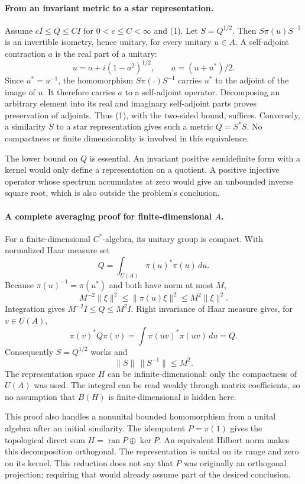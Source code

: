 \documentclass[11pt]{article}
\begin{document}
\paragraph{From an invariant metric to a star representation.}
Assume $cI\le Q\le CI$ for $0<c\le C<\infty$ and (1). Let $S=Q^{1/2}$. Then $S\pi(u)S^{-1}$ is an invertible isometry, hence unitary, for every unitary $u\in A$. A self-adjoint contraction $a$ is the real part of a unitary:
\[
 u=a+i(1-a^2)^{1/2},\qquad a=(u+u^*)/2.
\]
Since $u^*=u^{-1}$, the homomorphism $S\pi(\cdot)S^{-1}$ carries $u^*$ to the adjoint of the image of $u$. It therefore carries $a$ to a self-adjoint operator. Decomposing an arbitrary element into its real and imaginary self-adjoint parts proves preservation of adjoints. Thus (1), with the two-sided bound, suffices. Conversely, a similarity $S$ to a star representation gives such a metric $Q=S^*S$. No compactness or finite dimensionality is involved in this equivalence.

The lower bound on $Q$ is essential. An invariant positive semidefinite form with a kernel would only define a representation on a quotient. A positive injective operator whose spectrum accumulates at zero would give an unbounded inverse square root, which is also outside the problem's conclusion.

\paragraph{A complete averaging proof for finite-dimensional $A$.}
For a finite-dimensional $C^*$-algebra, its unitary group is compact. With normalized Haar measure set
\[
 Q=\int_{U(A)}\pi(u)^*\pi(u)\,du.
\]
Because $\pi(u)^{-1}=\pi(u^*)$ and both have norm at most $M$,
\[
 M^{-2}\|\xi\|^2\le\|\pi(u)\xi\|^2\le M^2\|\xi\|^2.
\]
Integration gives $M^{-2}I\le Q\le M^2I$. Right invariance of Haar measure gives, for $v\in U(A)$,
\[
 \pi(v)^*Q\pi(v)
 =\int\pi(uv)^*\pi(uv)\,du=Q.
\]
Consequently $S=Q^{1/2}$ works and
\[
 \|S\|\,\|S^{-1}\|\le M^2.                                \tag{2}
\]
The representation space $H$ can be infinite-dimensional: only the compactness of $U(A)$ was used. The integral can be read weakly through matrix coefficients, so no assumption that $B(H)$ is finite-dimensional is hidden here.

This proof also handles a nonunital bounded homomorphism from a unital algebra after an initial similarity. The idempotent $P=\pi(1)$ gives the topological direct sum $H=\operatorname{ran}P\oplus\ker P$. An equivalent Hilbert norm makes this decomposition orthogonal. The representation is unital on its range and zero on its kernel. This reduction does not say that $P$ was originally an orthogonal projection; requiring that would already assume part of the desired conclusion.
\end{document}
